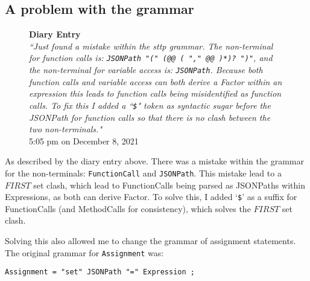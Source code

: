 \subsection{A problem with the grammar}

\begin{figure}[H]
    \begin{center}
        \textbf{Diary Entry}\\[0.5em]
        \cprotect\textit{``Just found a mistake within the sttp grammar. The non-terminal for function calls is: \verb|JSONPath "(" (@@ ( "," @@ )*)? ")"|, and the non-terminal for variable access is: \verb|JSONPath|. Because both function calls and variable access can both derive a Factor within an expression this leads to function calls being misidentified as function calls. To fix this I added a ``\verb|$|" token as syntactic sugar before the JSONPath for function calls so that there is no clash between the two non-terminals."}\\[0.5em]
        \tiny{5:05 pm on December 8, 2021}
    \end{center}
\end{figure}

As described by the diary entry above. There was a mistake within the grammar for the non-terminals: \verb|FunctionCall| and \verb|JSONPath|. This mistake lead to a $FIRST$ set clash, which lead to FunctionCalls being parsed as JSONPaths within Expressions, as both can derive Factor. To solve this, I added `\verb|$|' as a suffix for FunctionCalls (and MethodCalls for consistency), which solves the $FIRST$ set clash.

Solving this also allowed me to change the grammar of assignment statements. The original grammar for \verb|Assignment| was:

\begin{verbatim}
Assignment = "set" JSONPath "=" Expression ;
\end{verbatim}
